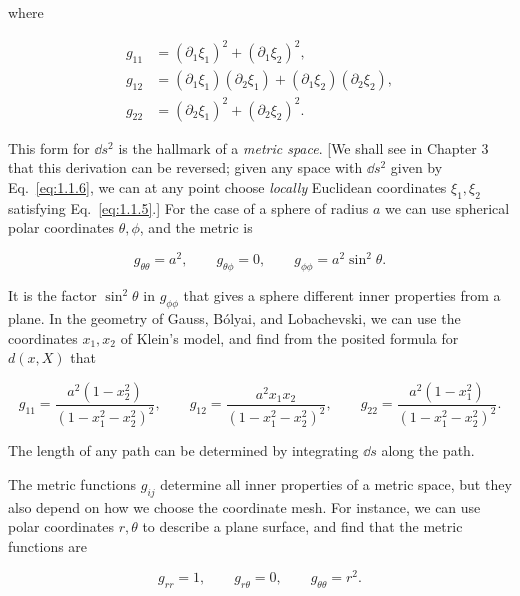 where

\begin{equation}
  \begin{aligned}
    g_{11}&=(\partial_1\xi_1)^2+(\partial_1\xi_2)^2,\\
    g_{12}&=(\partial_1\xi_1)(\partial_2\xi_1)
            +(\partial_1\xi_2)(\partial_2\xi_2),\\
    g_{22}&=(\partial_2\xi_1)^2+(\partial_2\xi_2)^2.
  \end{aligned}
  \tag{1.1.7}\label{eq:1.1.7}
\end{equation}

This form for \(\dd s^2\) is the hallmark of a \emph{metric space}. [We shall see
in Chapter 3 that this derivation can be reversed; given any space with
\(\dd s^2\) given by Eq.~\eqref{eq:1.1.6}, we can at any point choose
\emph{locally} Euclidean coordinates \(\xi_1,\xi_2\) satisfying
Eq.~\eqref{eq:1.1.5}.] For the case of a sphere of radius \(a\) we can use
spherical polar coordinates \(\theta,\phi\), and the metric is

\begin{equation}
  g_{\theta\theta}=a^2,\qquad
  g_{\theta\phi}=0,\qquad
  g_{\phi\phi}=a^2\sin^2\theta.
  \tag{1.1.8}\label{eq:1.1.8}
\end{equation}

It is the factor \(\sin^2\theta\) in \(g_{\phi\phi}\) that gives a sphere
different inner properties from a plane. In the geometry of Gauss, B\'olyai,
and Lobachevski, we can use the coordinates \(x_1,x_2\) of Klein's model, and
find from the posited formula for \(d(x,X)\) that

\begin{equation}
  g_{11}=\frac{a^2(1-x_2^2)}{(1-x_1^2-x_2^2)^2},
  \qquad
  g_{12}=\frac{a^2x_1x_2}{(1-x_1^2-x_2^2)^2},
  \qquad
  g_{22}=\frac{a^2(1-x_1^2)}{(1-x_1^2-x_2^2)^2}.
  \tag{1.1.9}\label{eq:1.1.9}
\end{equation}

The length of any path can be determined by integrating \(\dd s\) along the
path.

The metric functions \(g_{ij}\) determine all inner properties of a metric
space, but they also depend on how we choose the coordinate mesh. For
instance, we can use polar coordinates \(r,\theta\) to describe a plane
surface, and find that the metric functions are

\begin{equation}
  g_{rr}=1,\qquad g_{r\theta}=0,\qquad g_{\theta\theta}=r^2.
  \tag{1.1.10}\label{eq:1.1.10}
\end{equation}

